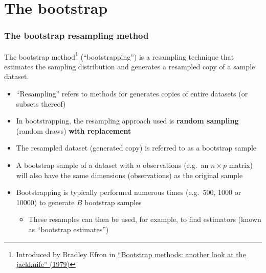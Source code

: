 \documentclass[smaller]{beamer}
\newcommand{\?}{\stackrel{?}{=}}
\newcommand{\gr}{\color{green!40!black}}
\begin{document}
\section{The bootstrap}

\begin{frame}
  \frametitle{The bootstrap resampling method}
  \pause

  The bootstrap method\footnote{Introduced by Bradley Efron in \href{https://projecteuclid.org/journals/annals-of-statistics/volume-7/issue-1/Bootstrap-Methods-Another-Look-at-the-Jackknife/10.1214/aos/1176344552.full}{``Bootstrap methods: another look at the jackknife'' (1979)} } (``bootstrapping'') is a resampling technique that estimates the sampling distribution and generates a
  resampled copy of a sample dataset.  \pause

  \begin{itemize}
  \item ``Resampling'' refers to methods for  generates copies of entire datasets (or subsets thereof)
  \item In bootstrapping, the resampling approach used is \textbf{random sampling} (random draws) {\bf  with replacement} 
  \item The resampled dataset (generated copy) is referred to as a {\gr bootstrap sample}
  \item A bootstrap sample of a dataset with $n$ observations (e.g.\ an $n\times p$ matrix) will also have the same dimensions (observations) as the original sample
  \item Bootstrapping is typically performed numerous times (e.g.\ 500, 1000 or 10000) to generate $B$ bootstrap samples
    \begin{itemize}
    \item These resamples can then be used, for example,  to find estimators (known as ``bootstrap estimates'')
    \end{itemize}
  \end{itemize}
\end{frame}
\end{document}
